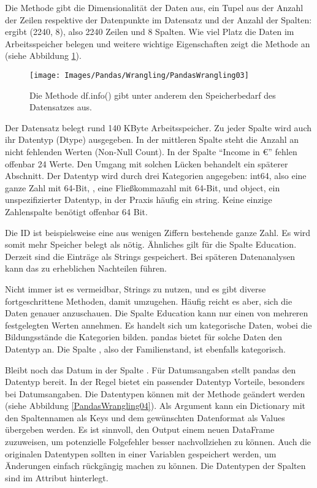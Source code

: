 Die Methode  gibt die Dimensionalität der Daten aus, ein Tupel aus der Anzahl der Zeilen respektive der Datenpunkte im Datensatz und der Anzahl der Spalten:  ergibt (2240, 8), also 2240 Zeilen und 8 Spalten. Wie viel Platz die Daten im Arbeitsspeicher belegen und weitere wichtige Eigenschaften zeigt die Methode  an (siehe Abbildung \ref{PandasWrangling03}).

\begin{figure}
    \centering
    \texttt{[image: Images/Pandas/Wrangling/PandasWrangling03]}    
    \caption{Die Methode df.info() gibt unter anderem den Speicherbedarf des Datensatzes aus.} \label{PandasWrangling03}
\end{figure}

Der Datensatz belegt rund 140 KByte Arbeitsspeicher. Zu jeder Spalte wird auch ihr Datentyp (Dtype) ausgegeben. In der mittleren Spalte steht die Anzahl an nicht fehlenden Werten (Non-Null Count). In der Spalte ``Income in \euro{}'' fehlen offenbar 24 Werte. Den Umgang mit solchen Lücken behandelt ein späterer Abschnitt. Der Datentyp wird durch drei Kategorien angegeben: int64, also eine ganze Zahl mit 64-Bit, , eine Fließkommazahl mit 64-Bit, und object, ein unspezifizierter Datentyp, in der Praxis häufig ein string. Keine einzige Zahlenspalte benötigt offenbar 64 Bit.

Die ID ist beispielsweise eine aus wenigen Ziffern bestehende ganze Zahl. Es wird somit mehr Speicher belegt als nötig. Ähnliches gilt für die Spalte Education. Derzeit sind die Einträge als Strings gespeichert. Bei späteren Datenanalysen kann das zu erheblichen Nachteilen führen.

Nicht immer ist es vermeidbar, Strings zu nutzen, und es gibt diverse fortgeschrittene Methoden, damit umzugehen. Häufig reicht es aber, sich die Daten genauer anzuschauen. Die Spalte Education kann nur einen von mehreren festgelegten Werten annehmen. Es handelt sich um kategorische Daten, wobei die Bildungsstände die Kategorien bilden. pandas bietet für solche Daten den Datentyp  an. Die Spalte , also der Familienstand, ist ebenfalls kategorisch.

Bleibt noch das Datum in der Spalte . Für Datumsangaben stellt pandas den Datentyp  bereit. In der Regel bietet ein passender Datentyp Vorteile, besonders bei Datumsangaben. Die Datentypen können mit der Methode  geändert werden (siehe Abbildung \ref{PandasWrangling04}). Als Argument kann ein Dictionary mit den Spaltennamen als Keys und dem gewünschten Datenformat als Values übergeben werden. Es ist sinnvoll, den Output einem neuen DataFrame zuzuweisen, um potenzielle Folgefehler besser nachvollziehen zu können. Auch die originalen Datentypen sollten in einer Variablen gespeichert werden, um Änderungen einfach rückgängig machen zu können. Die Datentypen der Spalten sind im Attribut  hinterlegt.

